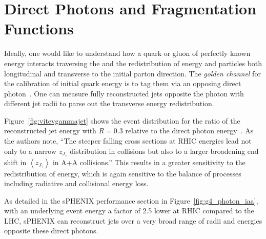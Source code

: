 

\section{Direct Photons and Fragmentation Functions}
\label{sec:direct_photons_and_ff}

Ideally, one would like to understand how a quark or gluon of
perfectly known energy interacts traversing the \qgp and the
redistribution of energy and particles both longitudinal and
transverse to the initial parton direction.  The \emph{golden channel}
for the calibration of initial quark energy is to tag them via an
opposing direct photon~\cite{Wang:1996yh}.  One can measure fully
reconstructed jets opposite the photon with different jet radii to
parse out the transverse energy redistribution.

Figure~\ref{fig:vitevgammajet} shows the event distribution for the
ratio of the reconstructed jet energy with $R=0.3$ relative to the
direct photon energy~\cite{Dai:2012am}.  As the authors note, ``The
steeper falling cross sections at RHIC energies lead not only to a
narrow $z_{J_{\gamma}}$ distribution in \pp collisions but also to a
larger broadening end shift in $\left<z_{J_{\gamma}}\right>$ in A+A
collisions.''  This results in a greater sensitivity to the
redistribution of energy, which is again sensitive to the balance of
processes including radiative and collisional energy loss.

As detailed in the sPHENIX performance section in
Figure~\ref{fig:g4_photon_iaa}, with an underlying event energy a
factor of 2.5 lower at RHIC compared to the LHC, sPHENIX can
reconstruct jets over a very broad range of radii and energies
opposite these direct photons.

